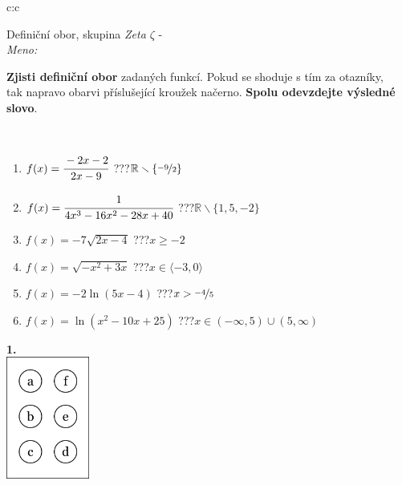 \documentclass[10pt]{report}
\begin{document}
\begin{tabular}{c:c}
\begin{minipage}[c][104.5mm][t]{0.5\linewidth}
\begin{center}
\vspace{7mm}
{\huge Definiční obor, skupina \textit{Zeta $\zeta$} -}\\[5mm]
\textit{Meno:}\phantom{xxxxxxxxxxxxxxxxxxxxxxxxxxxxxxxxxxxxxxxxxxxxxxxxxxxxxxxxxxxxxxxxx}\\[5mm]
\begin{minipage}{0.95\linewidth}
\textbf{Zjisti definiční obor} zadaných funkcí. Pokud se shoduje s tím za otazníky,\\tak napravo obarvi příslušející kroužek načerno. \textbf{Spolu odevzdejte výsledné slovo}.
\end{minipage}
\\[1mm]
\begin{minipage}{0.79\linewidth}
\begin{center}
\begin{varwidth}{\linewidth}
\begin{enumerate}
\normalsizerrr
\item $f(x)=\cfrac{-2x-2}{2x-9}$\quad \dotfill\; ???\;\dotfill \quad $\mathbb{R}\smallsetminus\{\nicefrac{-9}{2}\}$
\item $f(x)=\cfrac{1}{4x^3-16x^2-28x+40}$\quad \dotfill\; ???\;\dotfill \quad $\mathbb{R}\smallsetminus\{1,5,-2\}$
\item $f(x)=-7\sqrt{2x-4}$\quad \dotfill\; ???\;\dotfill \quad $x\geq-2$
\item $f(x)=\sqrt{-x^2+3x}$\quad \dotfill\; ???\;\dotfill \quad $x\in\langle-3 , 0\rangle$
\item $f(x)=-2\ln{(5x-4)}$\quad \dotfill\; ???\;\dotfill \quad $x>\nicefrac{-4}{5}$
\item $f(x)=\ln{(x^2-10x+25)}$\quad \dotfill\; ???\;\dotfill \quad $x\in(-\infty , 5)\cup(5 , \infty)$
\end{enumerate}
\end{varwidth}
\end{center}
\end{minipage}
\begin{minipage}{0.20\linewidth}
\begin{center}
{\Huge\bfseries 1.} \\[2mm]
\includegraphics[height=40mm]{../images/braille.png}

\end{center}
\end{minipage}
\end{center}
\end{minipage}
\end{tabular}
\end{document}
